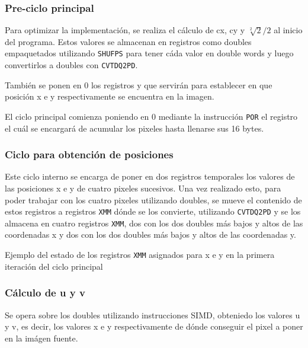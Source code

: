 \subsubsection{Pre-ciclo principal}
Para optimizar la implementación, se realiza el cálculo de cx, cy y $\sqrt[2]{2}/2$ al inicio del programa. Estos valores se almacenan en registros como doubles empaquetados utilizando \texttt{SHUFPS} para tener cáda valor en double words y luego convertirlos a doubles con \texttt{CVTDQ2PD}.

También se ponen en 0 los registros  y  que servirán para establecer en que posición x e y respectivamente se encuentra en la imagen.

El ciclo principal comienza poniendo en 0 mediante la instrucción \texttt{POR} el registro  el cuál se encargará de acumular los pixeles hasta llenarse sus 16 bytes.

\subsubsection{Ciclo para obtención de posiciones}
Este ciclo interno se encarga de poner en dos registros temporales los valores de las posiciones x e y de cuatro pixeles sucesivos. Una vez realizado esto, para poder trabajar con los cuatro pixeles utilizando doubles, se mueve el contenido de estos registros a registros \texttt{XMM} dónde se los convierte, utilizando \texttt{CVTDQ2PD} y se los almacena en cuatro registros \texttt{XMM}, dos con los dos doubles más bajos y altos de las coordenadas x y dos con los dos doubles más bajos y altos de las coordenadas y.

\begin{center}
\end{center}
Ejemplo del estado de los registros \texttt{XMM} asignados para x e y en la primera iteración del ciclo principal

\subsubsection{Cálculo de u y v}
Se opera sobre los doubles utilizando instrucciones SIMD, obteniedo los valores u y v, es decir, los valores x e y respectivamente de dónde conseguir el pixel a poner en la imágen fuente.

